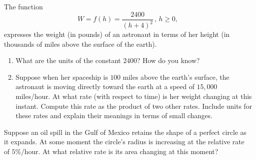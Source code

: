 \documentclass{ximera}
\begin{document}
\begin{question} \label{Qdf8r3fgdsf}
The function
\[
  W =f(h)  = \frac{2400}{(h+4)^2}  \, , \,h \geq 0 ,
\]
expresses the weight (in pounds) of an astronaut in terms of her height (in thousands of miles above the surface of the earth).

\begin{enumerate}
\item What are the units of the constant $2400$? How do you know?

\item Suppose when her spaceship is $100$ miles above the earth's surface, the astronaut is moving directly toward the earth at a speed of $15,000$ miles/hour. At what rate (with respect to time) is her weight changing at this instant. Compute this rate as the product of two other rates. Include units for these rates and explain their meanings in terms of small changes.
\end{enumerate}

\end{question}

\begin{question}  \label{QOdfdfrDFGDF}
Suppose an oil spill in the Gulf of Mexico retains the shape of a perfect circle as it expands. At some moment the circle's radius is increasing at the relative rate of $5\%$/hour. At what relative rate is its area changing at this moment?
\end{question}
\end{document}
